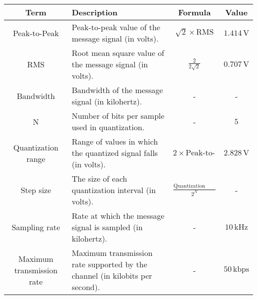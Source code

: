 

\begin{center}
\begin{tabular}{|c|p{6cm}|c|c|}
\hline
\textbf{Term} & \textbf{Description} & \textbf{Formula} & \textbf{Value} \\
\hline
Peak-to-Peak & Peak-to-peak value of the message signal (in volts). & $\sqrt{2} \times \text{RMS}$ & $1.414 \, \text{V}$ \\
\hline
RMS & Root mean square value of the message signal (in volts). & $\frac{2}{2\sqrt{2}}$ & $0.707 \, \text{V}$ \\
\hline
Bandwidth & Bandwidth of the message signal (in kilohertz). & - & - \\
\hline
N & Number of bits per sample used in quantization. & - & $5$ \\
\hline
Quantization range & Range of values in which the quantized signal falls (in volts). & $2 \times \text{Peak-to-Peak}$ & $2.828 \, \text{V}$ \\
\hline
Step size & The size of each quantization interval (in volts). & $\frac{\text{Quantization range}}{2^N}$ & - \\
\hline
Sampling rate & Rate at which the message signal is sampled (in kilohertz). & - & $10 \, \text{kHz}$ \\
\hline
Maximum transmission rate & Maximum transmission rate supported by the channel (in kilobits per second). & - & $50 \, \text{kbps}$ \\
\hline
\end{tabular}
\end{center}

